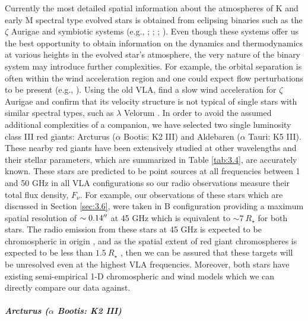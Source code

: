Currently the most detailed spatial information about the atmospheres of K and early M spectral type evolved stars is obtained from eclipsing binaries such as the $\zeta$ Aurigae and symbiotic systems (e.g., \citealt{wright_1970}; \citealt{baade_1996}; \citealt{eaton_2008}; \citealt{crowley_2008}). Even though these systems offer us the best opportunity to obtain information on the dynamics and thermodynamics at various heights in the evolved star's atmosphere, the very nature of the binary system may introduce further complexities. For example, the orbital separation is often within the wind acceleration region and one could expect flow perturbations to be present (e.g., \citealt{chapman_1981}). 
Using the old VLA, \cite{harper_2005} find a slow wind acceleration for $\zeta$ Aurigae and confirm that its velocity structure is not typical of single stars with similar spectral types, such as $\lambda$ Velorum \citep{carpenter_1999}.   In order to avoid the assumed additional complexities of a companion, we have selected two single luminosity class III red giants: Arcturus ($\alpha$ Bootis: K2 III) and Aldebaren ($\alpha$ Tauri: K5 III). These nearby red giants have been extensively studied at other wavelengths and their stellar parameters, which are summarized in Table \ref{tab:3.4}, are accurately known. These stars are predicted to be point sources at all frequencies between 1 and 50 GHz in all VLA configurations so our radio observations measure their total flux density, $F_{\nu}$. For example, our observations of these stars which are discussed in Section \ref{sec:3.6}, were taken in B configuration providing a maximum spatial resolution of $\sim 0.14 ^{\prime\prime}$ at 45 GHz which is equivalent to $\sim 7\ R_{\star}$ for both stars. The radio emission from these stars at 45 GHz is expected to be chromospheric in origin \citep{harper_2013}, and as the spatial extent of red giant chromospheres is expected to be less than $1.5 \ R_{\star}$ \citep{berio_2011}, then we can be assured that these targets will be unresolved even at the highest VLA frequencies. Moreover, both stars have existing semi-empirical 1-D chromospheric and wind models which we can directly compare our data against.
\\
\\
\textbf{\textit{Arcturus ($\alpha$ Bootis: K2 III)}}\\
